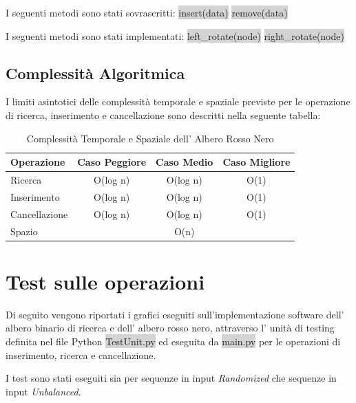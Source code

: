 \documentclass{article}
\begin{document}
			I seguenti metodi sono stati sovrascritti:
			\colorbox{lightgray}{insert(data)} \colorbox{lightgray}{remove(data)}
			
			I seguenti metodi sono stati implementati: \colorbox{lightgray}{left\_rotate(node)} \colorbox{lightgray}{right\_rotate(node)}
			
		\newpage
		\subsection{Complessità Algoritmica}

				I limiti asintotici delle complessità temporale e spaziale previste per le operazione di ricerca, inserimento e cancellazione sono descritti nella seguente tabella:
	
				\begin{table}[ht]
					\centering
					\begin{tabular}{|l|ccc|}
						\rowcolor[HTML]{C0C0C0}
						\hline
						Operazione    & Caso Peggiore & Caso Medio & Caso Migliore \\
						\hline
						Ricerca       & O(log n)          & O(log n)    & O(1)          \\
						\hline
						Inserimento   & O(log n)          & O(log n)    & O(1)          \\
						\hline
						Cancellazione & O(log n)          & O(log n)    & O(1)		   \\
						\hline
						\noalign{\smallskip}
						\noalign{\smallskip}
						\hline
						Spazio		  &			 	  & O(n) 	   &			   \\
						\hline
					\end{tabular}
					\caption{Complessità Temporale e Spaziale dell' Albero Rosso Nero}
				\end{table}

	\section{Test sulle operazioni}
		Di seguito vengono riportati i grafici eseguiti sull'implementazione software dell' albero binario di ricerca e dell' albero rosso nero, attraverso l' unità di testing definita nel file Python \colorbox{lightgray}{TestUnit.py} ed eseguita da \colorbox{lightgray}{main.py} per le operazioni di inserimento, ricerca e cancellazione.
		
		I test sono stati eseguiti sia per sequenze in input \textit{Randomized} che sequenze in input \textit{Unbalanced}.
		
\end{document}
